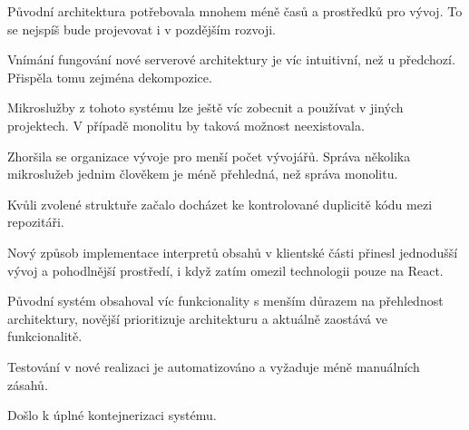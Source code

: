 \begin{ul}
   \item Původní  architektura potřebovala mnohem méně časů a prostředků pro vývoj.
   To se nejspíš bude projevovat i v pozdějším rozvoji.
   \item Vnímání fungování nové serverové architektury je víc intuitivní, než u předchozí.
   Přispěla tomu zejména dekompozice.
   \item Mikroslužby z tohoto systému lze ještě víc zobecnit a používat v jiných projektech.
   V případě monolitu by taková možnost neexistovala.
   \item Zhoršila se organizace vývoje pro menší počet vývojářů.
   Správa několika mikroslužeb jednim člověkem je méně přehledná, než správa monolitu.
   \item Kvůli zvolené struktuře začalo docházet ke kontrolované duplicitě kódu mezi repozitáři.
   \item Nový způsob implementace interpretů obsahů v klientské části přinesl jednodušší vývoj a pohodlnější prostředí, i když zatím omezil technologii pouze na React.
   \item Původní systém obsahoval víc funkcionality s menším důrazem na přehlednost architektury, novější prioritizuje architekturu a aktuálně zaostává ve funkcionalitě.
   \item Testování v nové realizaci je automatizováno a vyžaduje méně manuálních zásahů.
   \item Došlo k úplné kontejnerizaci systému.
\end{ul}





